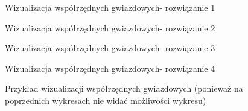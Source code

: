 \documentclass{article}
\newcommand{\speciallabel}[2]{
\node[above] at (#1,1 + #2){Kryt. 1};
\node[below] at (#1,-1 + #2){Kryt. 3};
\node[rotate=90] at (-1.2 + #1,#2) {Kryt. 4};
\node[rotate=270] at (1.2 + #1,#2) {Kryt. 2}; 
}
\newcommand{\startcord}[7]{%
    \speciallabel{#5}{#6}
    \draw[black] (#5,#6) circle (1cm);
    \node (p1) at (#5,#1 + #6){};
    \node (p2) at (#2+#5,#6){};
    \node (p3) at (#5,-#3 + #6){};
    \node (p4) at (-#4+#5, #6){};
    \draw[color=black,fill=#7] (p1.center) -- (p2.center) -- (p3.center) -- (p4.center) -- (p1.center);
    \draw (#5,1 + #6) -- (#5,-1 + #6);
    \draw (1+#5,#6) -- (-1+#5,#6);
}
\newcommand{\startcordlines}[7]{%
    \speciallabel{#5}{#6}
    \draw (#5,1 + #6) -- (#5,-1 + #6);
    \draw (1+#5,#6) -- (-1+#5,#6);
    \draw[black] (#5,#6) circle (1cm);
    \node (p1) at (#5,#1 + #6){};
    \node (p2) at (#2+#5,#6){};
    \node (p3) at (#5,-#3 + #6){};
    \node (p4) at (-#4+#5, #6){};
    \draw[color=#7,line width = 2.5pt] (p1.center) -- (p3.center);
    \draw[color=#7,line width = 2.5pt] (p2.center) -- (p4.center);
}
\newcommand\spider[8]{%
    \def\tempa{#1}%
    \def\tempb{#2}%
    \def\tempc{#3}%
    \def\tempd{#4}%
    \def\tempe{#5}%
    \def\tempf{#6}%
    \def\tempg{#7}%
    \spidercontinued#8
}
\newcommand{\spidercontinued}[5]{%
    \speciallabel{\tempe}{\tempf}
    \draw[black] (-1+\tempe,\tempf) -- (\tempe,1+\tempf) -- (1+\tempe,\tempf)-- (\tempe,-1+\tempf) -- cycle;
    \node (p1) at (\tempe,\tempa + \tempf){};
    \node (p2) at (\tempb + \tempe,\tempf){};
    \node (p3) at (\tempe,-\tempc + \tempf){};
    \node (p4) at (-\tempd+\tempe, \tempf){};
    \draw[color=black,fill=\tempg] (p1.center) -- (p2.center) -- (p3.center) -- (p4.center) -- (p1.center);
    \draw[color = black,fill = brown!50!black] (\tempe,\tempf+#2) --  (\tempe + #3,\tempf) --  (\tempe,\tempf - #4) --  (\tempe -#5 ,\tempf) --  (\tempe,\tempf+#2);
    \draw (\tempe,1 + \tempf) -- (\tempe,-1 + \tempf);
    \draw (1+\tempe,\tempf) -- (-1+\tempe,\tempf);
}
\begin{document}

\begin{figure}[]
    \centering
    \caption{Wizualizacja współrzędnych gwiazdowych- rozwiązanie 1}
    \label{fig:star_cord}
\end{figure}

\begin{figure}[]
    \centering
    \caption{Wizualizacja współrzędnych gwiazdowych- rozwiązanie 2}
    \label{fig:star_cord}
\end{figure}

\begin{figure}[]
    \centering
    \caption{Wizualizacja współrzędnych gwiazdowych- rozwiązanie 3}
    \label{fig:star_cord}
\end{figure}

\begin{figure}[]
    \centering
    \caption{Wizualizacja współrzędnych gwiazdowych- rozwiązanie 4}
    \label{fig:star_cord}
\end{figure}

\begin{figure}[]
    \centering
    \caption{Przykład wizualizacji współrzędnych gwiazdowych \linebreak (ponieważ na poprzednich wykresach nie widać możliwości wykresu)}
    \label{fig:star_cord}
\end{figure}
\end{document}
